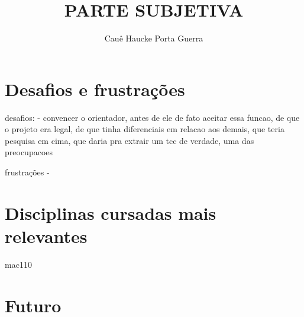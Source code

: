\documentclass[titlepage,a4paper]{article}
\title{PARTE SUBJETIVA}
\author{Cauê Haucke Porta Guerra}
\begin{document}
\maketitle

\tableofcontents
\newpage
\section{Desafios e frustrações}
desafios:
- convencer o orientador, antes de ele de fato aceitar essa funcao, de que o projeto era legal, de que tinha diferenciais
em relacao aos demais, que teria pesquisa em cima, que daria pra extrair um tcc de verdade, uma das preocupacoes


frustrações
- 


\section{Disciplinas cursadas mais relevantes}
mac110



\section{Futuro}
\end{document}
